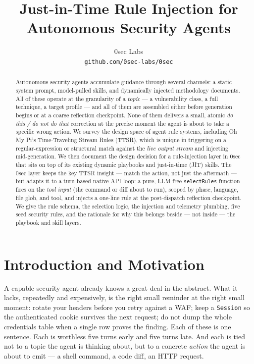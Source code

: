 \documentclass[11pt]{article}
\title{Just-in-Time Rule Injection for Autonomous Security Agents}
\author{
  0sec Labs \\
  \texttt{github.com/0sec-labs/0sec}
}
\date{}
\begin{document}
\maketitle

\begin{abstract}
Autonomous security agents accumulate guidance through several channels: a
static system prompt, model-pulled skills, and dynamically injected
methodology documents. All of these operate at the granularity of a
\emph{topic} --- a vulnerability class, a full technique, a target profile ---
and all of them are assembled either before generation begins or at a
coarse reflection checkpoint. None of them delivers a small, atomic
\emph{do this / do not do that} correction at the precise moment the agent is
about to take a specific wrong action. We survey the design space of
agent rule systems, including Oh My Pi's Time-Traveling Stream Rules (TTSR),
which is unique in triggering on a regular-expression or structural match
against the \emph{live output stream} and injecting mid-generation. We then
document the design decision for a rule-injection layer in 0sec that sits on
top of its existing dynamic playbooks and just-in-time (JIT) skills. The 0sec
layer keeps the key TTSR insight --- match the action, not just the aftermath
--- but adapts it to a turn-based native-API loop: a pure, LLM-free
\texttt{selectRules} function fires on the \emph{tool input} (the command or
diff about to run), scoped by phase, language, file glob, and tool, and injects
a one-line rule at the post-dispatch reflection checkpoint. We give the rule
schema, the selection logic, the injection and telemetry plumbing, five seed
security rules, and the rationale for why this belongs beside --- not inside ---
the playbook and skill layers.
\end{abstract}

\section{Introduction and Motivation}

A capable security agent already knows a great deal in the abstract. What it
lacks, repeatedly and expensively, is the right small reminder at the right
small moment: rotate your headers before you retry against a WAF; keep a
\texttt{Session} so the authenticated cookie survives the next request; do not
dump the whole credentials table when a single row proves the finding. Each of
these is one sentence. Each is worthless five turns early and five turns late.
And each is tied not to a topic the agent is thinking about, but to a concrete
\emph{action} the agent is about to emit --- a shell command, a code diff, an
HTTP request.
\end{document}
